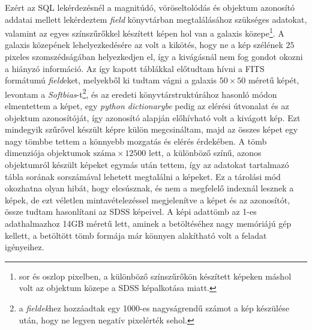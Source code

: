 \documentclass[12pt,letterpaper,twoside,openright]{book}
\begin{document}
 Ezért az SQL lekérdezésnél a magnitúdó, vöröseltolódás és objektum azonosító addatai mellett lekérdeztem \textit{field} könyvtárban megtalálásához szükséges adatokat, valamint az egyes színszűrőkkel készített képen hol van a galaxis közepe\footnote{sor és oszlop pixelben, a különböző színszűrőkön készített képeken  máshol volt az objektum közepe a SDSS képalkotása miatt.}. A galaxis közepének lehelyezkedésére az volt a kikötés, hogy ne a kép szélének $25$ pixeles szomszédságában helyezkedjen el, így a kivágásnál nem fog gondot okozni a hiányzó információ. Az így kapott táblákkal előtudtam hívni a FITS formátumú \textit{field}eket, melyekből ki tudtam vágni a galaxis $50\times 50$ méretű képét, levontam a \textit{Softbias}-t\footnote{a \textit{fieldek}hez hozzáadtak egy 1000-es nagyságrendű számot a kép készülése után, hogy ne legyen negatív pixelérték sehol.}, és az eredeti könyvtárstruktúrához hasonló módon elmentettem a képet, egy \textit{python dictionarybe} pedig az elérési útvonalat és az objektum azonosítóját, így azonosító alapján előhívható volt a kivágott kép. Ezt mindegyik szűrővel készült képre külön megcsináltam, majd az összes képet egy nagy tömbbe tettem a könnyebb mozgatás és elérés érdekében. A tömb dimenziója $\text{objektumok száma}\times \num{12500}$ lett, a különböző színű, azonos objektumról készült képeket egymás után tettem, így az adatokat tartalmazó tábla sorának sorszámával lehetett megtalálni a képeket. Ez a tárolási mód okozhatna olyan hibát, hogy elcsúsznak, és nem a megfelelő indexnál lesznek a képek, de ezt véletlen mintavételezéssel megjelenítve a képet és az azonosítót, össze tudtam hasonlítani az SDSS képeivel. A képi adattömb az 1-es adathalmazhoz 14GB méretű lett,  aminek a betöltéséhez nagy memóriájú gép kellett, a betöltött tömb formája már könnyen alakítható volt a feladat igényeihez. %
 
 
\end{document}
